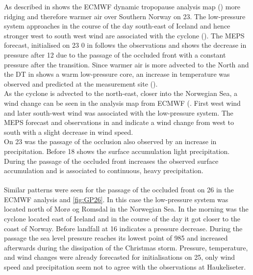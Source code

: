\pagebreak
\noindent
As described in  shows the ECMWF dynamic tropopause analysis map () more ridging and therefore warmer air over Southern Norway on \SI{23}{\dec}. The low-pressure system approaches in the course of the day south-east of Iceland and hence stronger west to south west wind are associated with the cyclone (). The MEPS forecast, initialised on \SI{23}{\dec} \SI{0}{\UTC} in  follows the observations and shows the decrease in pressure after \SI{12}{\UTC} due to the passage of the occluded front with a constant pressure after the transition. Since warmer air is more advected to the North and the DT in  shows a warm low-pressure core, an increase in temperature was observed and predicted at the measurement site (). 
\\
As the cyclone is advected to the north-east, closer into the Norwegian Sea, a wind change can be seen in the analysis map from ECMWF (. First west wind and later south-west wind was associated with the low-pressure system. The MEPS forecast and observations in  and  indicate a wind change from west to south with a slight decrease in wind speed.
\\
On \SI{23}{\dec} was the passage of the occlusion also observed by an increase in precipitation. Before \SI{18}{\UTC} shows the surface accumulation light precipitation. During the passage of the occluded front increases the observed surface accumulation and is associated to continuous, heavy precipitation.
\\
\\
Similar patterns were seen for the passage of the occluded front on \SI{26}{\dec} in the ECMWF analysis  and \ref{fig:GP26}. In this case the low-pressure system was located north of Morø og Romsdal in the Norwegian Sea. In the morning was the cyclone located east of Iceland and in the course of the day it got closer to the coast of Norway. Before landfall at \SI{16}{\UTC} indicates  a pressure decrease. During the passage the sea level pressure reaches its lowest point of \SI{985}{\hPa} and increased afterwards during the dissipation of the Christmas storm. Pressure, temperature, and wind changes were already forecasted for initialisations on \SI{25}{\dec}, only wind speed and precipitation seem not to agree with the observations at Haukeliseter.
\\
